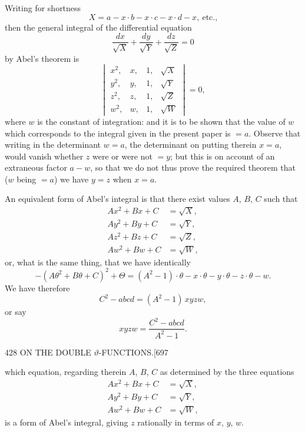 \documentclass[11pt]{article}
\begin{document}
Writing for shortness
\[ X = a-x \cdot b-x \cdot c-x \cdot d-x,\ \text{etc.,} \]
then the general integral of the differential equation
\[ \frac{dx}{\sqrt{X}} + \frac{dy}{\sqrt{Y}} + \frac{dz}{\sqrt{Z}} = 0 \]
by Abel's theorem is
\[ \begin{vmatrix} x^{2}, & x, & 1, & \sqrt{X}\\ y^{2}, & y, & 1, & \sqrt{Y}\\ z^{2}, & z, & 1, & \sqrt{Z}\\ w^{2}, & w, & 1, & \sqrt{W} \end{vmatrix} = 0, \]
where $w$ is the constant of integration: and it is to be shown that the value of $w$ which corresponds to the integral given in the present paper is $= a$. Observe that writing in the determinant $w = a$, the determinant on putting therein $x = a$, would vanish whether $z$ were or were not $= y$; but this is on account of an extraneous factor $a - w$, so that we do not thus prove the required theorem that ($w$ being $= a$) we have $y = z$ when $x = a$.

An equivalent form of Abel's integral is that there exist values $A$, $B$, $C$ such that
\begin{align*}
A x^{2} + B x + C &= \sqrt{X},\\
A y^{2} + B y + C &= \sqrt{Y},\\
A z^{2} + B z + C &= \sqrt{Z},\\
A w^{2} + B w + C &= \sqrt{W},
\end{align*}
or, what is the same thing, that we have identically
\[ -(A\theta^{2} + B\theta + C)^{2} + \Theta = (A^{2} - 1)\cdot\theta - x \cdot \theta - y \cdot \theta - z \cdot \theta - w. \]
We have therefore
\[ C^{2} - abcd = (A^{2} - 1)\,xyzw, \]
or say
\[ xyzw = \frac{C^{2} - abcd}{A^{2} - 1}. \]

\clearpage
\begin{center}\small 428 \hfill ON THE DOUBLE $\vartheta$-FUNCTIONS.\hfill [697\end{center}

which equation, regarding therein $A$, $B$, $C$ as determined by the three equations
\begin{align*}
A x^{2} + B x + C &= \sqrt{X},\\
A y^{2} + B y + C &= \sqrt{Y},\\
A w^{2} + B w + C &= \sqrt{W},
\end{align*}
is a form of Abel's integral, giving $z$ rationally in terms of $x$, $y$, $w$.
\end{document}
